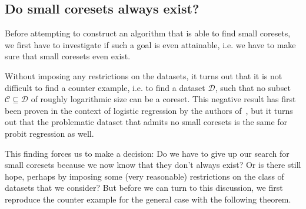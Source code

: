 \subsection{Do small coresets always exist?}

Before attempting to construct an algorithm that
is able to find small coresets, we first
have to investigate if such a goal is even attainable,
i.e. we have to make sure that small coresets even exist.

Without imposing any restrictions on the datasets, it turns out
that it is not difficult to find a counter example, i.e. to find
a dataset $\mathcal{D}$, such that no subset
$\mathcal{C} \subseteq \mathcal{D}$ of roughly logarithmic size
can be a coreset. This negative result has first been
proven in the context of logistic regression by the
authors of~\cite{on-coresets}, but it turns out that
the problematic dataset that admits no small coresets is
the same for probit regression as well.

This finding forces us to make a decision:
Do we have to give up our search for small coresets because
we now know that they don't always exist?
Or is there still hope, perhaps by imposing some (very reasonable)
restrictions on the class of datasets that we consider?
But before we can turn to this discussion, we first reproduce
the counter example for the general case with the following theorem.

